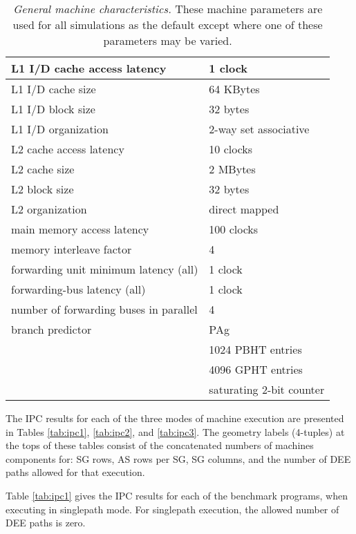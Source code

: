 \documentclass[10pt,dvips]{article}
\begin{document}
\begin{table}
\begin{center}
\caption{{\em General machine characteristics.}
These machine parameters are used for all simulations as
the default except where one of these parameters may be varied.}
\label{tab:params}
\begin{tabular}{|l|l|}
\hline 
L1 I/D cache access latency&1 clock\\
\hline
L1 I/D cache size&64 KBytes\\
\hline
L1 I/D block size&32 bytes\\
\hline
L1 I/D organization&2-way set associative\\
\hline
L2 cache access latency&10 clocks\\
\hline
L2 cache size&2 MBytes\\
\hline
L2 block size&32 bytes\\
\hline
L2 organization&direct mapped\\
\hline
main memory access latency&100 clocks\\
\hline
memory interleave factor&4\\
\hline
forwarding unit minimum latency (all)&1 clock\\
\hline
forwarding-bus latency (all)&1 clock\\
\hline
number of forwarding buses in parallel&4\\
\hline
branch predictor&PAg\\
\cline{2-2}
 & 1024 PBHT entries\\
\cline{2-2}
 & 4096 GPHT entries\\
\cline{2-2}
 & saturating 2-bit counter\\
\hline
\end{tabular}
\end{center}
\end{table}
%
The IPC results for each of the three modes of machine execution
are presented in Tables \ref{tab:ipc1}, \ref{tab:ipc2}, and \ref{tab:ipc3}.
The geometry labels (4-tuples) 
at the tops of these tables consist of the concatenated 
numbers of
machines components for: SG rows, AS rows per SG, SG columns,
and the number of DEE paths allowed for that execution.

Table \ref{tab:ipc1} gives the IPC results for each of the benchmark
programs, when executing in
singlepath mode.
For singlepath execution, the allowed number of 
DEE paths is zero.
\end{document}
